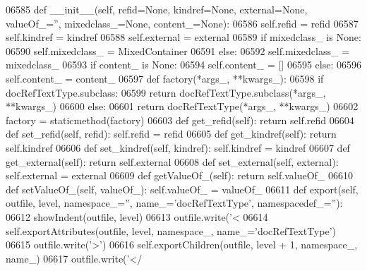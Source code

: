 \begin{DoxyCode}
{{{{{{{{{{{{{{{{{{{{{{{{{{{{{{{{{{{{{{{{{{{{{{{{{{{{{{{{{{{{{{{{{{{{{{{{{{{{{{{{{{{{{{{{{{{{{{{{{{{{{{{{{{{{{{{{{{{{{{{{{{{{{{{{{{{{{{{{{{{{{{{{{{{{{{{{{{{{{{{{{{{{{{{{{{{{{{{{{{{{{{{{{{{{{{{{{{{{{{{{{{{{{{{{{{{{{{{{{{{{{{{{{{{{{{{{{{{{{{{{{{{{{{{{{{{{{{{{{{{{{{{{{{{{{{{{{{{{{{{{{{{{{{{{{{{{{{{{{{{{{{{{{{{{{{{{{{{{{{{{{{{{{{{{{{{{{{{{{{{{{{{{{{{{{{{{{{{{{{{{{{{{{{{{{{{{{{{{{{{{{{{{{{{{{{{{{{{{{{{{{{{06585     \textcolor{keyword}{def }__init__(self, refid=None, kindref=None, external=None, valueOf\_='', mixedclass\_=None, 
      content\_=None):
06586         self.refid = refid
06587         self.kindref = kindref
06588         self.external = external
06589         \textcolor{keywordflow}{if} mixedclass\_ \textcolor{keywordflow}{is} \textcolor{keywordtype}{None}:
06590             self.mixedclass_ = MixedContainer
06591         \textcolor{keywordflow}{else}:
06592             self.mixedclass_ = mixedclass\_
06593         \textcolor{keywordflow}{if} content\_ \textcolor{keywordflow}{is} \textcolor{keywordtype}{None}:
06594             self.content_ = []
06595         \textcolor{keywordflow}{else}:
06596             self.content_ = content\_
06597     \textcolor{keyword}{def }factory(*args\_, **kwargs\_):
06598         \textcolor{keywordflow}{if} docRefTextType.subclass:
06599             \textcolor{keywordflow}{return} docRefTextType.subclass(*args\_, **kwargs\_)
06600         \textcolor{keywordflow}{else}:
06601             \textcolor{keywordflow}{return} docRefTextType(*args\_, **kwargs\_)
06602     factory = staticmethod(factory)
06603     \textcolor{keyword}{def }get_refid(self): \textcolor{keywordflow}{return} self.refid
06604     \textcolor{keyword}{def }set_refid(self, refid): self.refid = refid
06605     \textcolor{keyword}{def }get_kindref(self): \textcolor{keywordflow}{return} self.kindref
06606     \textcolor{keyword}{def }set_kindref(self, kindref): self.kindref = kindref
06607     \textcolor{keyword}{def }get_external(self): \textcolor{keywordflow}{return} self.external
06608     \textcolor{keyword}{def }set_external(self, external): self.external = external
06609     \textcolor{keyword}{def }getValueOf_(self): \textcolor{keywordflow}{return} self.valueOf\_
06610     \textcolor{keyword}{def }setValueOf_(self, valueOf\_): self.valueOf\_ = valueOf\_
06611     \textcolor{keyword}{def }export(self, outfile, level, namespace\_='', name\_='docRefTextType', namespacedef\_=''):
06612         showIndent(outfile, level)
06613         outfile.write(\textcolor{stringliteral}{'<%
06614         self.exportAttributes(outfile, level, namespace\_, name\_=\textcolor{stringliteral}{'docRefTextType'})
06615         outfile.write(\textcolor{stringliteral}{'>'})
06616         self.exportChildren(outfile, level + 1, namespace\_, name\_)
06617         outfile.write(\textcolor{stringliteral}{'</%
}}}}}}}}}}}}}}}}}}}}}}}}}}}}}}}}}}}}}}}}}}}}}}}}}}}}}}}}}}}}}}}}}}}}}}}}}}}}}}}}}}}}}}}}}}}}}}}}}}}}}}}}}}}}}}}}}}}}}}}}}}}}}}}}}}}}}}}}}}}}}}}}}}}}}}}}}}}}}}}}}}}}}}}}}}}}}}}}}}}}}}}}}}}}}}}}}}}}}}}}}}}}}}}}}}}}}}}}}}}}}}}}}}}}}}}}}}}}}}}}}}}}}}}}}}}}}}}}}}}}}}}}}}}}}}}}}}}}}}}}}}}}}}}}}}}}}}}}}}}}}}}}}}}}}}}}}}}}}}}}}}}}}}}}}}}}}}}}}}}}}}}}}}}}}}}}}}}}}}}}}}}}}}}}}}}}}}}}}}}}}}}}}}}}}}}}}}}}}}}}}}}}}
\end{DoxyCode}
